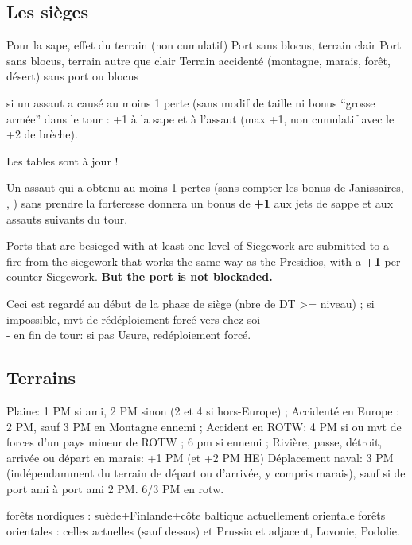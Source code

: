 \subsection{Les sièges}
\aparag Pour la sape, effet du terrain (non cumulatif)
      Port sans blocus, terrain clair
      Port sans blocus, terrain autre que clair
 Terrain accidenté (montagne, marais, forêt, désert) sans port
ou blocus

\aparag[TBD] si un assaut a causé au moins 1 perte (sans modif de
taille ni bonus ``grosse armée'' dans le tour : +1 à la sape et à
l'assaut (max +1, non cumulatif avec le +2 de brèche).


\aparag Les tables sont à jour !

\aparag[Expérimental]
Un assaut qui a obtenu au moins 1 pertes (sans compter les bonus
de Janissaires, \RUS, \POL) sans prendre la forteresse donnera un 
bonus de {\bf +1} aux jets de sappe et aux assauts suivants du tour.

Ports that are besieged with at least one level of Siegework are
submitted to a fire from the siegework that works the same way as the
Presidios, with a {\bf +1} per counter Siegework\faceplus.  {\bf But the
 port is not blockaded.}

Ceci est regardé au début de la phase de siège (nbre de DT >= niveau) ;
si impossible, mvt de rédéploiement forcé vers chez soi \\
- en fin de tour: si pas Usure\faceplus, redéploiement forcé.


\subsection{Terrains}

\bparag Plaine: 1 PM si ami, 2 PM sinon (2 et 4 si hors-Europe) ;
\bparag Accidenté en Europe : 2 PM, sauf 3 PM en Montagne ennemi ;
\bparag Accident en ROTW: 4 PM si ou mvt de forces d'un pays mineur de
ROTW ; 6 pm si ennemi ;
\bparag Rivière, passe, détroit, arrivée ou départ en marais: +1 PM (et
+2 PM HE)
\bparag Déplacement naval: 3 PM (indépendamment du terrain de départ ou
d'arrivée, y compris marais), sauf si de port ami à port ami 2 PM. 6/3
PM en rotw.

\bparag  forêts nordiques : suède+Finlande+côte baltique actuellement orientale
\bparag forêts orientales : celles actuelles (sauf dessus) et Prussia et
adjacent, Lovonie, Podolie.


